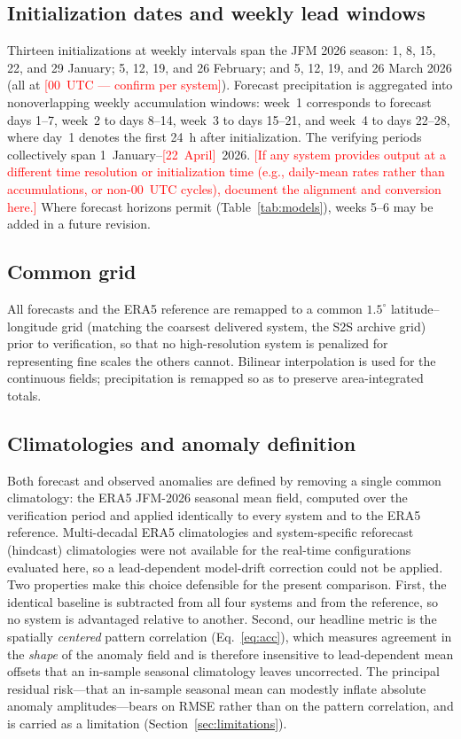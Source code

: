 \documentclass[11pt]{article}
\newcommand{\ph}[1]{\textcolor{red}{[#1]}}
\begin{document}
\subsection{Initialization dates and weekly lead windows}\label{sec:weeks}

Thirteen initializations at weekly intervals span the JFM 2026 season:
1, 8, 15, 22, and 29 January; 5, 12, 19, and 26 February; and 5, 12,
19, and 26 March 2026 (all at \ph{00~UTC --- confirm per system}).
Forecast precipitation is aggregated into nonoverlapping weekly
accumulation windows: week~1 corresponds to forecast days 1--7, week~2
to days 8--14, week~3 to days 15--21, and week~4 to days 22--28, where
day~1 denotes the first 24~h after initialization. The verifying
periods collectively span 1~January--\ph{22~April}~2026. \ph{If any
system provides output at a different time resolution or
initialization time (e.g., daily-mean rates rather than accumulations,
or non-00~UTC cycles), document the alignment and conversion here.}
Where forecast horizons permit (Table~\ref{tab:models}), weeks 5--6 may
be added in a future revision.

\subsection{Common grid}\label{sec:grid}

All forecasts and the ERA5 reference are remapped to a common
$1.5^{\circ}$ latitude--longitude grid (matching the coarsest delivered
system, the S2S archive grid) prior to verification, so that no
high-resolution system is penalized for representing fine scales the
others cannot. Bilinear interpolation is used for the continuous fields;
precipitation is remapped so as to preserve area-integrated totals.

\subsection{Climatologies and anomaly definition}\label{sec:anom}

Both forecast and observed anomalies are defined by removing a single
common climatology: the ERA5 JFM-2026 seasonal mean field, computed
over the verification period and applied identically to every system
and to the ERA5 reference. Multi-decadal ERA5 climatologies and
system-specific reforecast (hindcast) climatologies were not available
for the real-time configurations evaluated here, so a lead-dependent
model-drift correction could not be applied. Two properties make this
choice defensible for the present comparison. First, the identical
baseline is subtracted from all four systems and from the reference, so
no system is advantaged relative to another. Second, our headline
metric is the spatially \emph{centered} pattern correlation
(Eq.~\ref{eq:acc}), which measures agreement in the \emph{shape} of the
anomaly field and is therefore insensitive to lead-dependent mean
offsets that an in-sample seasonal climatology leaves uncorrected. The
principal residual risk---that an in-sample seasonal mean can modestly
inflate absolute anomaly amplitudes---bears on RMSE rather than on the
pattern correlation, and is carried as a limitation
(Section~\ref{sec:limitations}).
\end{document}
